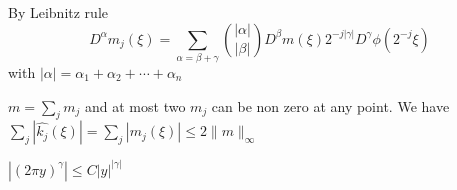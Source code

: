\documentclass{report}
\theoremstyle{definition}
\theoremstyle{definition}
\theoremstyle{plain}
\numberwithin{theorem}{subsection}
\numberwithin{remark}{subsection}
\newcommand{\norm}[1]{\lVert#1\rVert}
\newcommand{\abs}[1]{\left\lvert#1\right\rvert}
\begin{document}
\begin{errata}[P212]
    By Leibnitz rule
    \begin{equation*}
        D^\alpha m_j(\xi)=\sum_{\alpha=\beta+\gamma}\binom{\abs{\alpha}}{\abs{\beta}} D^\beta m(\xi)2^{-j\abs{\gamma}}D^\gamma\phi(2^{-j}\xi)
    \end{equation*}
    with $\abs{\alpha}=\alpha_1+\alpha_2+\cdots+\alpha_n$
\end{errata}
\begin{errata}[P212]
    $m=\sum_j m_j$ and at most two $m_j$ can be non zero at any point. We have
    $\sum_j\abs{\hat{k_j}(\xi)}=\sum_j\abs{m_j(\xi)}\leq 2\norm{m}_\infty$
\end{errata}
\begin{errata}[P214]
    $\abs{(2\pi y)^\gamma}\leq C\abs{y}^{\abs{\gamma}}$
\end{errata}
\end{document}
